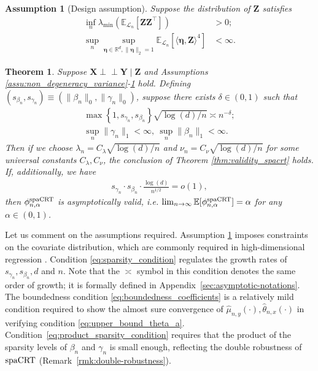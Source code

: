 \documentclass[12pt]{article}
\newtheorem{assumption}{Assumption}
\newtheorem{theorem}{Theorem}
\theoremstyle{definition}
\newcommand{\indep}{\perp \!\!\! \perp}
\newcommand{\E}{\mathbb E}								%
\newcommand{\prx}{\bm X}								%
\newcommand{\prz}{\bm Z}								%
\newcommand{\pry}{{\bm Y}}								%
\newcommand{\law}{\mathcal L}							%
\newcommand{\spacrt}{\textnormal{spaCRT}}               %
\begin{document}
  \begin{assumption}[Design assumption]\label{assu:design_assumption}
	Suppose the distribution of $\prz$ satisfies
	\begin{align}
	  \inf_{n} \lambda_{\min}(\E_{\law_n}[\prz\prz^\top]) &> 0;\label{eq:boundedness_eigenvalue}\\
	  \sup_{n} \sup_{\bm \eta\in\mathbb{R}^{d}, \|\bm\eta\|_2=1}\E_{\law_n}[\langle \bm \eta, \prz \rangle^4] &<\infty.\label{eq:fourth_moment_XZ}
	\end{align} 
  \end{assumption}
  
  \begin{theorem}\label{thm:high_dim_glm_spacrt}
	Suppose $\prx\indep\pry \mid \prz$ and Assumptions \ref{assu:non_degeneracy_variance}-\ref{assu:design_assumption} hold. Defining $(s_{\beta_n},s_{\gamma_n}) \equiv (\|\beta_n\|_0,\|\gamma_n\|_0)$, suppose there exists $\delta\in(0,1)$ such that
	\begin{align}
	  \max\left\{1,s_{\gamma_n},s_{\beta_n}\right\} \sqrt{\log(d)/n}\asymp n^{-\delta};\label{eq:sparsity_condition}\\
	  \sup_n\|\gamma_n\|_1<\infty,\ \sup_n\|\beta_n\|_1<\infty.\label{eq:boundedness_coefficients}
	\end{align}
	Then if we choose $\lambda_n=C_{\lambda} \sqrt{\log(d)/n}$ and $\nu_n=C_{\nu}\sqrt{\log(d)/n}$ for some universal constants $C_\lambda,C_\nu$, the conclusion of Theorem \ref{thm:validity_spacrt} holds. If, additionally, we have 
	\begin{align}\label{eq:product_sparsity_condition}
	  s_{\gamma_n}\cdot s_{\beta_n}\cdot \frac{\log(d)}{n^{1/2}}=o(1),
	\end{align}
	then $\phi_{n,\alpha}^\mathrm{\spacrt}$ is asymptotically valid, i.e. $\lim_{n\rightarrow\infty}\E[\phi_{n,\alpha}^{\spacrt}]=\alpha$ for any $\alpha\in(0,1)$. 
  \end{theorem}
  
  Let us comment on the assumptions required. Assumption \ref{assu:design_assumption} imposes constraints on the covariate distribution, which are commonly required in high-dimensional regression \citep{Wainwright2019}. Condition \eqref{eq:sparsity_condition} regulates the growth rates of $s_{\gamma_n},s_{\beta_n},d$ and $n$. Note that the $\asymp$ symbol in this condition denotes the same order of growth; it is formally defined in Appendix~\ref{sec:asymptotic-notations}. The boundedness condition \eqref{eq:boundedness_coefficients} is a relatively mild condition required to show the almost sure convergence of $\widehat{\mu}_{n,y}(\cdot), \widehat{\theta}_{n,x}(\cdot)$ in verifying condition \eqref{eq:upper_bound_theta_a}. Condition~\eqref{eq:product_sparsity_condition} requires that the product of the sparsity levels of $\beta_n$ and $\gamma_n$ is small enough, reflecting the double robustness of $\spacrt$ (Remark~\ref{rmk:double-robustness}).
  
\end{document}
